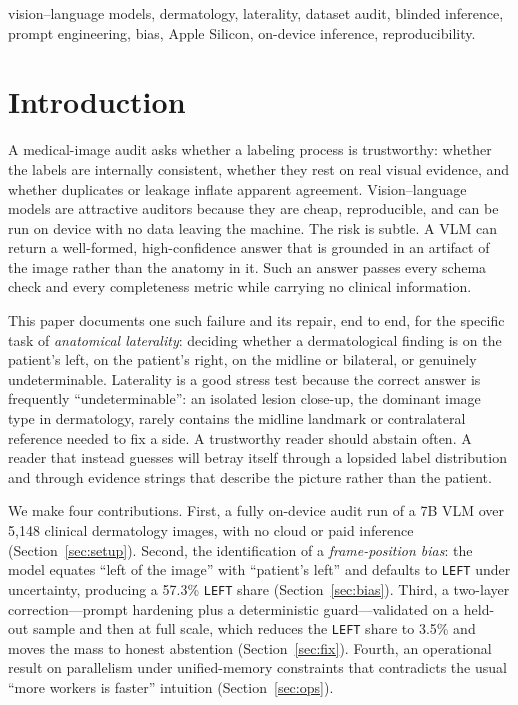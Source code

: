 \documentclass[conference]{IEEEtran}
\begin{document}
\begin{IEEEkeywords}
vision--language models, dermatology, laterality, dataset audit, blinded inference, prompt engineering, bias, Apple Silicon, on-device inference, reproducibility.
\end{IEEEkeywords}

\section{Introduction}
A medical-image audit asks whether a labeling process is trustworthy: whether the labels are internally consistent, whether they rest on real visual evidence, and whether duplicates or leakage inflate apparent agreement. Vision--language models are attractive auditors because they are cheap, reproducible, and can be run on device with no data leaving the machine. The risk is subtle. A VLM can return a well-formed, high-confidence answer that is grounded in an artifact of the image rather than the anatomy in it. Such an answer passes every schema check and every completeness metric while carrying no clinical information.

This paper documents one such failure and its repair, end to end, for the specific task of \emph{anatomical laterality}: deciding whether a dermatological finding is on the patient's left, on the patient's right, on the midline or bilateral, or genuinely undeterminable. Laterality is a good stress test because the correct answer is frequently ``undeterminable'': an isolated lesion close-up, the dominant image type in dermatology, rarely contains the midline landmark or contralateral reference needed to fix a side. A trustworthy reader should abstain often. A reader that instead guesses will betray itself through a lopsided label distribution and through evidence strings that describe the picture rather than the patient.

We make four contributions. First, a fully on-device audit run of a 7B VLM over 5{,}148 clinical dermatology images, with no cloud or paid inference (Section~\ref{sec:setup}). Second, the identification of a \emph{frame-position bias}: the model equates ``left of the image'' with ``patient's left'' and defaults to \texttt{LEFT} under uncertainty, producing a 57.3\% \texttt{LEFT} share (Section~\ref{sec:bias}). Third, a two-layer correction---prompt hardening plus a deterministic guard---validated on a held-out sample and then at full scale, which reduces the \texttt{LEFT} share to 3.5\% and moves the mass to honest abstention (Section~\ref{sec:fix}). Fourth, an operational result on parallelism under unified-memory constraints that contradicts the usual ``more workers is faster'' intuition (Section~\ref{sec:ops}).
\end{document}
